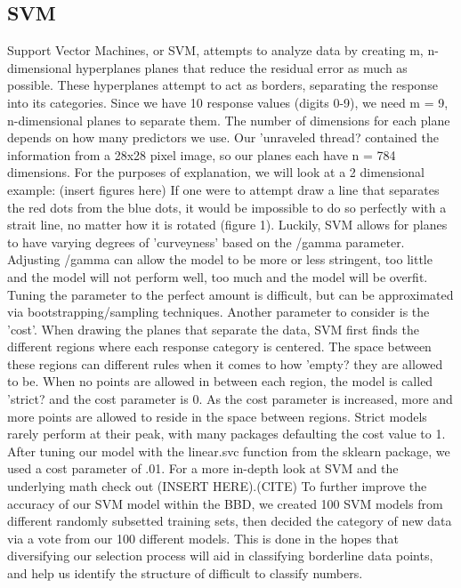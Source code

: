 \documentclass[11pt, oneside]{article}   	%
\begin{document}
\subsection{SVM}
Support Vector Machines, or SVM, attempts to analyze data by creating m, n-dimensional hyperplanes planes that reduce the residual error as much as possible. These hyperplanes attempt to act as borders, separating the response into its categories. Since we have 10 response values (digits 0-9), we need m = 9, n-dimensional planes to separate them. The number of dimensions for each plane depends on how many predictors we use. Our 'unraveled thread? contained the information from a 28x28 pixel image, so our planes each have n = 784 dimensions. For the purposes of explanation, we will look at a 2 dimensional example: (insert figures here) If one were to attempt draw a line that separates the red dots from the blue dots, it would be impossible to do so perfectly with a strait line, no matter how it is rotated (figure 1). Luckily, SVM allows for planes to have varying degrees of 'curveyness' based on the /gamma parameter. Adjusting /gamma can allow the model to be more or less stringent, too little and the model will not perform well, too much and the model will be overfit. Tuning the parameter to the perfect amount is difficult, but can be approximated via bootstrapping/sampling techniques. Another parameter to consider is the 'cost'. When drawing the planes that separate the data, SVM first finds the different regions where each response category is centered. The space between these regions can different rules when it comes to how 'empty? they are allowed to be. When no points are allowed in between each region, the model is called 'strict?  and the cost parameter is 0. As the cost parameter is increased, more and more points are allowed to reside in the space between regions. Strict models rarely perform at their peak, with many packages defaulting the cost value to 1. After tuning our model with the linear.svc function from the sklearn package, we used a cost parameter of .01. For a more in-depth look at SVM and the underlying math check out (INSERT HERE).(CITE)
To further improve the accuracy of our SVM model within the BBD, we created 100 SVM models from different randomly subsetted training sets, then decided the category of new data via a vote from our 100 different models. This is done in the hopes that diversifying our selection process will aid in classifying borderline data points, and help us identify the structure of difficult to classify numbers.
\end{document}
